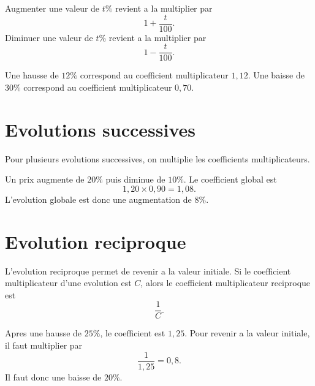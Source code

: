 \documentclass[french,11pt]{book}
\newcommand{\pourcent}{\%}
\begin{document}
Augmenter une valeur de $t\pourcent$ revient a la multiplier par
\[
1+\frac{t}{100}.
\]
Diminuer une valeur de $t\pourcent$ revient a la multiplier par
\[
1-\frac{t}{100}.
\]

\begin{exemple}
Une hausse de $12\pourcent$ correspond au coefficient multiplicateur $1{,}12$.
Une baisse de $30\pourcent$ correspond au coefficient multiplicateur $0{,}70$.
\end{exemple}

\section*{Evolutions successives}

Pour plusieurs evolutions successives, on multiplie les coefficients multiplicateurs.

\begin{exemple}
Un prix augmente de $20\pourcent$ puis diminue de $10\pourcent$. Le coefficient global est
\[
1{,}20\times0{,}90=1{,}08.
\]
L'evolution globale est donc une augmentation de $8\pourcent$.
\end{exemple}

\section*{Evolution reciproque}

L'evolution reciproque permet de revenir a la valeur initiale. Si le coefficient multiplicateur d'une evolution est $C$, alors le coefficient multiplicateur reciproque est
\[
\frac{1}{C}.
\]

\begin{exemple}
Apres une hausse de $25\pourcent$, le coefficient est $1{,}25$. Pour revenir a la valeur initiale, il faut multiplier par
\[
\frac{1}{1{,}25}=0{,}8.
\]
Il faut donc une baisse de $20\pourcent$.
\end{exemple}
\end{document}
